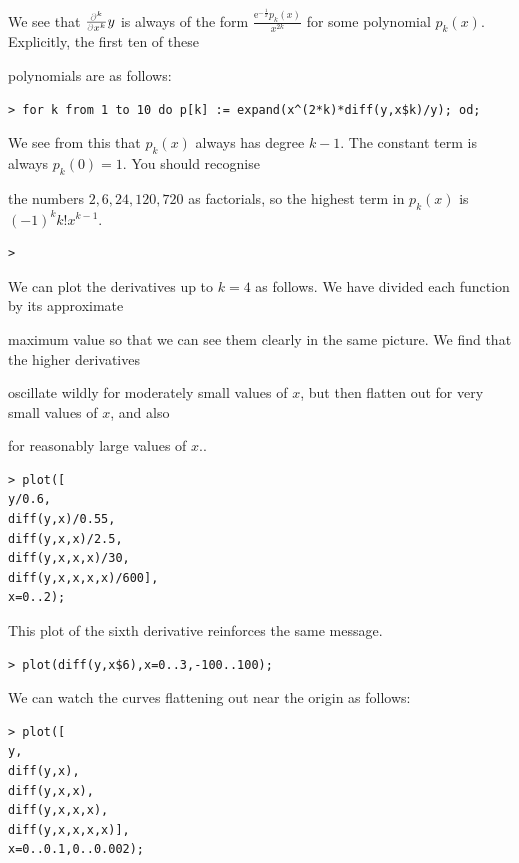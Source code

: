 \documentclass{article}
\begin{document}
\begin{Maple Normal}
We see that 
$\frac{{\textcolor{gray}{\partial}}^{k}}{\textcolor{gray}{\partial}x^{k}} y$ is always of the form 
$\frac{{\mathrm e}^{-\frac{1}{x}} p_{k}(x)}{x^{2 k}}$ for some polynomial 
$p_{k}(x)$.  Explicitly, the first ten of these \

polynomials are as follows:\


\end{Maple Normal}
\begin{lstlisting}
> for k from 1 to 10 do p[k] := expand(x^(2*k)*diff(y,x$k)/y); od;
\end{lstlisting}
\begin{Maple Normal}
We see from this that 
$p_{k}(x)$ always has degree 
$k -1$.  The constant term is always 
$p_{k}(0)=1$.  You should recognise \

the numbers 
$2,6,24,120,720$ as factorials, so the highest term in 
$p_{k}(x)$ is 
$(-1)^{k} k ! x^{k -1}$.  
\end{Maple Normal}
\begin{lstlisting}
> 
\end{lstlisting}
\begin{Maple Normal}
We can plot the derivatives up to 
$k =4$ as follows.  We have divided each function by its approximate\

maximum value so that we can see them clearly in the same picture.   We find that the higher derivatives\

oscillate wildly for moderately small values of 
$x$, but then flatten out for very small values of 
$x$, and also\

for reasonably large values of 
$x$..
\end{Maple Normal}
\begin{lstlisting}
> plot([
y/0.6,
diff(y,x)/0.55,
diff(y,x,x)/2.5,
diff(y,x,x,x)/30,
diff(y,x,x,x,x)/600],
x=0..2);
\end{lstlisting}
\begin{Maple Normal}
This plot of the sixth derivative reinforces the same message.
\end{Maple Normal}
\begin{lstlisting}
> plot(diff(y,x$6),x=0..3,-100..100);
\end{lstlisting}
\begin{Maple Normal}
We can watch the curves flattening out near the origin as follows:
\end{Maple Normal}
\begin{lstlisting}
> plot([
y,
diff(y,x),
diff(y,x,x),
diff(y,x,x,x),
diff(y,x,x,x,x)],
x=0..0.1,0..0.002);
\end{lstlisting}
\end{document}
